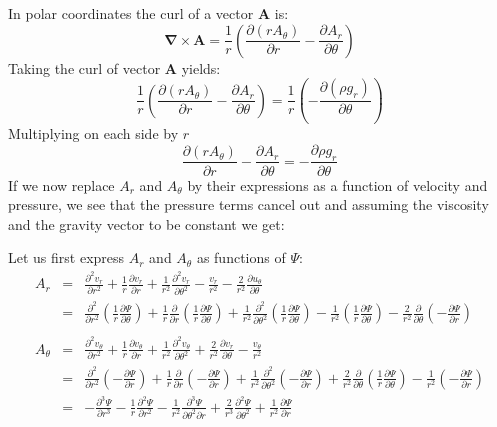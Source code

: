 In polar coordinates the curl of a vector ${\bm A}$ is:
\[
{\bm \nabla}\times {\bm A}
=
\frac{1}{r}\left(  
\frac{\partial (r A_\theta)}{\partial r}
-
\frac{\partial A_r}{\partial \theta}
\right)
\]
Taking the curl of vector ${\bm A}$ yields:
\[
\frac{1}{r}\left(  
\frac{\partial (r A_\theta)}{\partial r}
- \frac{\partial A_r}{\partial \theta}
\right)
=
\frac{1}{r}\left(  
- \frac{\partial (\rho g_r)}{\partial \theta}
\right)
\]
Multiplying on each side by $r$ 
\[
\frac{\partial (r A_\theta)}{\partial r}
- \frac{\partial A_r}{\partial \theta}
=
- \frac{\partial \rho g_r}{\partial \theta}
\]
If we now replace $A_r$ and $A_\theta$ by their expressions as a function of velocity and pressure, 
we see that the pressure terms cancel out 
and assuming the viscosity and the gravity vector to be constant we get:

Let us first express $A_r$ and $A_\theta$ as functions of $\Psi$:
\begin{eqnarray}
A_r 
&=& 
\frac{\partial^2 v_r}{\partial r^2} + \frac{1}{r} \frac{\partial v_r}{\partial r} +   
\frac{1}{r^2} \frac{\partial^2 v_r}{\partial \theta^2}
- \frac{v_r}{r^2} - \frac{2}{r^2} \frac{\partial u_\theta}{\partial \theta} \\ 
&=& 
\frac{\partial^2 }{\partial r^2} (\frac{1}{r}\frac{\partial \Psi}{\partial \theta})
+ \frac{1}{r} \frac{\partial }{\partial r} (\frac{1}{r}\frac{\partial \Psi}{\partial \theta})
+ \frac{1}{r^2} \frac{\partial^2 }{\partial \theta^2} (\frac{1}{r}\frac{\partial \Psi}{\partial \theta})
- \frac{1}{r^2} (\frac{1}{r}\frac{\partial \Psi}{\partial \theta})
- \frac{2}{r^2} \frac{\partial }{\partial \theta} (-\frac{\partial \Psi}{\partial r})\\
\\
A_\theta 
&=&
\frac{\partial^2 v_\theta}{\partial r^2} 
+ \frac{1}{r} \frac{\partial v_\theta}{\partial r} 
+ \frac{1}{r^2} \frac{\partial^2 v_\theta}{\partial \theta^2}
+\frac{2}{r^2} \frac{\partial v_r}{\partial \theta} 
- \frac{v_\theta}{r^2} \\
&=&
\frac{\partial^2 }{\partial r^2} (- \frac{\partial \Psi}{\partial r})
+ \frac{1}{r} \frac{\partial }{\partial r} (- \frac{\partial \Psi}{\partial r})
+ \frac{1}{r^2} \frac{\partial^2 }{\partial \theta^2}(- \frac{\partial \Psi}{\partial r})
+\frac{2}{r^2} \frac{\partial }{\partial \theta} (\frac{1}{r}\frac{\partial \Psi}{\partial \theta})
- \frac{1}{r^2} (- \frac{\partial \Psi}{\partial r})\\
&=&
- \frac{\partial^3 \Psi}{\partial r^3} 
- \frac{1}{r} \frac{\partial^2 \Psi}{\partial r^2} 
- \frac{1}{r^2} \frac{\partial^3 \Psi}{\partial \theta^2 \partial r} 
+\frac{2}{r^3} \frac{\partial^2 \Psi}{\partial \theta^2}
+ \frac{1}{r^2} \frac{\partial \Psi}{\partial r}\\
\end{eqnarray}






